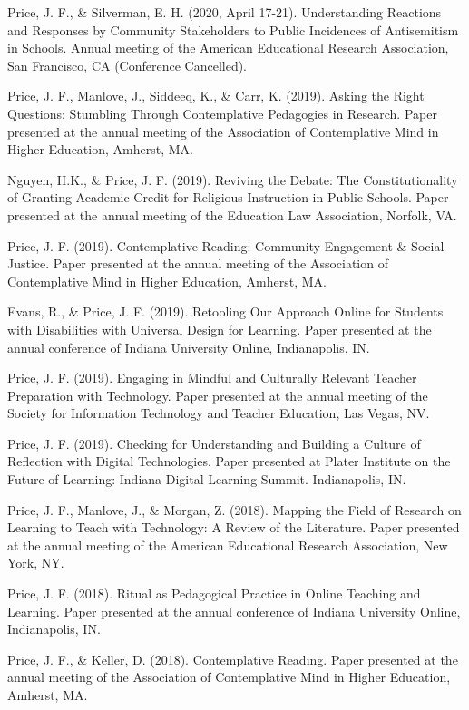 \documentclass[11pt,article,oneside]{memoir}
\begin{document}
\ind Price, J. F., \& Silverman, E. H. (2020, April 17-21). Understanding Reactions and Responses by Community Stakeholders to Public Incidences of Antisemitism in Schools. Annual meeting of the American Educational Research Association, San Francisco, CA (Conference Cancelled).

\ind Price, J. F., Manlove, J., Siddeeq, K., \& Carr, K. (2019). Asking the Right Questions: Stumbling Through Contemplative Pedagogies in Research. Paper presented at the annual meeting of the Association of Contemplative Mind in Higher Education, Amherst, MA.

\ind Nguyen, H.K., \& Price, J. F. (2019). Reviving the Debate: The Constitutionality of Granting Academic Credit for Religious Instruction in Public Schools. Paper presented at the annual meeting of the Education Law Association, Norfolk, VA.

\ind Price, J. F. (2019). Contemplative Reading: Community-Engagement \& Social Justice. Paper presented at the annual meeting of the Association of Contemplative Mind in Higher Education, Amherst, MA.

\ind Evans, R., \& Price, J. F. (2019). Retooling Our Approach Online for Students with Disabilities with Universal Design for Learning. Paper presented at the annual conference of Indiana University Online, Indianapolis, IN.

\ind Price, J. F. (2019). Engaging in Mindful and Culturally Relevant Teacher Preparation with Technology. Paper presented at the annual meeting of the Society for Information Technology and Teacher Education, Las Vegas, NV.

\ind Price, J. F. (2019). Checking for Understanding and Building a Culture of Reflection with Digital Technologies. Paper presented at Plater Institute on the Future of Learning: Indiana Digital Learning Summit. Indianapolis, IN.

\ind Price, J. F., Manlove, J., \& Morgan, Z. (2018). Mapping the Field of Research on Learning to Teach with Technology: A Review of the Literature. Paper presented at the annual meeting of the American Educational Research Association, New York, NY.

\ind Price, J. F. (2018). Ritual as Pedagogical Practice in Online Teaching and Learning. Paper presented at the annual conference of Indiana University Online, Indianapolis, IN.

\ind Price, J. F., \& Keller, D. (2018). Contemplative Reading. Paper presented at the annual meeting of the Association of Contemplative Mind in Higher Education, Amherst, MA.
\end{document}
